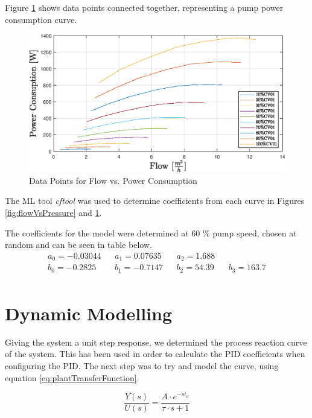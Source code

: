 \newpage
Figure \ref{fig:flowVsPowerConsumption} shows data points connected together, representing a pump
power consumption curve.

\begin{figure}[ht]
	\centering
	\includegraphics[width=1\textwidth]{figures/05mathematicalModelling/flowVsPowerRun34.eps}
	\caption{Data Points for Flow vs. Power Consumption}
	\label{fig:flowVsPowerConsumption}
\end{figure}

The ML tool \textit{cftool} was used to determine coefficients  from each curve in  Figures \ref{fig:flowVsPressure} and \ref{fig:flowVsPowerConsumption}.

The coefficients for the model were determined at 60 \% pump speed, chosen at random and can be seen in
table below.
\begin{align*}
	a_0 = -0.03044 && a_1 = 0.07635  && a_2 = 1.688  \\
	b_0 = -0.2825 && b_1 = -0.7147 && b_2 = 54.39 && b_3 = 163.7 \\
\end{align*}
\newpage
\section{Dynamic Modelling}
Giving the system a unit step response, we determined the process reaction curve of the system. This has been used 
in order to calculate the PID coefficients when configuring the PID.
The next step was to try and model the curve, using equation \ref{eq:plantTransferFunction}.

\begin{equation}
	\frac{Y(s)}{U(s)} = \frac{A \cdot e^{-st_d}}{\tau \cdot s + 1}
	\label{eq:plantTransferFunction}
\end{equation}


